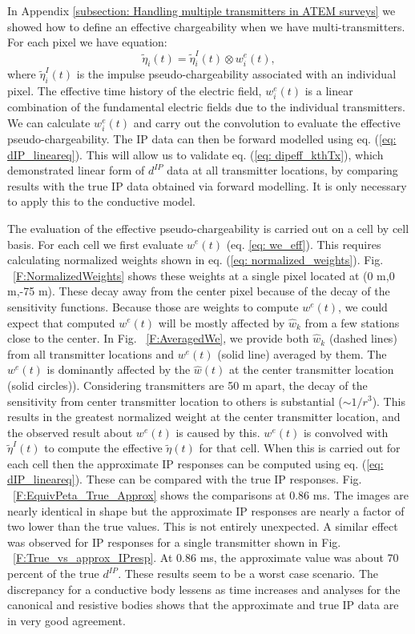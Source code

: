 \documentclass[extra,mreferee]{gji}
\newcommand{\peta}{\tilde{\eta}}
\newcommand{\dip}{d^{IP}}
\begin{document}
In Appendix \ref{subsection: Handling multiple transmitters in ATEM surveys} we showed how to define an effective chargeability when we have multi-transmitters. For each pixel we have
equation: 
\begin{equation}
  \peta_i(t) = \peta_i^I(t) \otimes  w_i^e(t),
\end{equation}
where $\peta_i^I(t)$ is the impulse pseudo-chargeability associated with an individual pixel. The effective time history of the electric field, $w_i^e(t)$ is a linear combination of the fundamental electric fields due to the individual transmitters. We can calculate $w_i^e(t)$ and carry out the convolution to evaluate the effective pseudo-chargeability. The IP data can then be forward modelled using eq. (\ref{eq: dIP_lineareq}). This will allow us to validate eq. (\ref{eq: dipeff_kthTx}), which demonstrated linear form of $\dip$ data at all transmitter locations, by comparing results with the true IP data obtained via forward modelling.
 It is only necessary to apply this to the conductive model. 

The evaluation of the effective pseudo-chargeability is carried out on  a cell by cell basis. For each cell  we  first evaluate $w^e(t)$ (eq. \ref{eq: we_eff}). This requires calculating normalized weights shown in eq. (\ref{eq: normalized_weights}). 
Fig. ~\ref{F:NormalizedWeights} shows these weights at a single pixel located at (0 m,0 m,-75 m). These decay away from the center pixel because of the decay of the sensitivity functions. 
Because those are weights to compute $w^e(t)$, we could expect that computed $w^e(t)$ will be mostly affected by $\hat{w}_k$ from a few stations close to the center. In Fig. ~\ref{F:AveragedWe}, we provide both $\hat{w}_k$ (dashed lines) from all transmitter locations and $w^e(t)$ (solid line) averaged by them. The $w^e(t)$ is dominantly affected by the $\hat{w}(t)$ at the center transmitter location (solid circles)). Considering transmitters are 50 m apart, the  decay of the sensitivity from center transmitter location to others is substantial ($\sim 1/r^3$). This results in the greatest normalized weight at the center transmitter location, and the observed result about $w^e(t)$ is caused by this. $w^e(t)$ is convolved  with  $\peta^I(t)$ to compute the effective $\peta(t)$ for that cell. When this is carried out for each cell then the approximate IP responses can be computed using eq. (\ref{eq: dIP_lineareq}). These can be compared with the true IP responses. 
Fig. ~\ref{F:EquivPeta_True_Approx} shows the comparisons at 0.86 ms. The images are nearly identical in shape but the approximate IP responses are nearly a factor of two lower than the true values. This is not entirely unexpected. A similar effect was observed for IP responses for a single transmitter shown in Fig. ~\ref{F:True_vs_approx_IPresp}. At 0.86 ms, the approximate value was about 70 percent of the true $\dip$. These results seem to be a worst case scenario. The discrepancy for a conductive body lessens as time increases and analyses for the canonical and resistive bodies shows that the approximate and true IP data are in very good agreement. 
\end{document}
